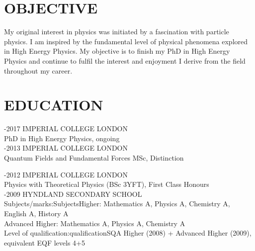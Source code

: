 \documentclass[9pt]{res} %
\begin{document}
 
 
\vspace{0.2cm}
\address{ \\44 Rue de la Combette, St Genis-Pouilly, Ain, France. 01630\\  +447815 520631	matthew.citron09@imperial.ac.uk}
 
                                             
\begin{resume}
                                               
 
\section{OBJECTIVE}
\vspace{0.2cm}
   My original interest in physics was initiated by a fascination with particle physics. I am inspired by the fundamental level of physical phenomena explored in High Energy Physics. My objective is to finish my PhD in High Energy Physics and continue to fulfil the interest and enjoyment I derive from the field throughout my career.
   
\section{EDUCATION} 

\vspace{0.2cm}

-2017 IMPERIAL COLLEGE LONDON \\
PhD in High Energy Physics, ongoing \\

 -2013 IMPERIAL COLLEGE LONDON \\
 Quantum Fields and Fundamental Forces MSc, Distinction

 -2012 IMPERIAL COLLEGE LONDON \\
Physics with Theoretical Physics (BSc 3YFT), First Class Honours \\
-2009 HYNDLAND SECONDARY SCHOOL \\
Subjects/marks:SubjectsHigher: Mathematics A, Physics A, Chemistry A, English A, History A \\
Advanced Higher: Mathematics A, Physics A, Chemistry A  \\
Level of qualification:qualificationSQA Higher (2008) + Advanced Higher (2009), equivalent EQF levels 4+5 \\
 

\end{resume}
\end{document}
